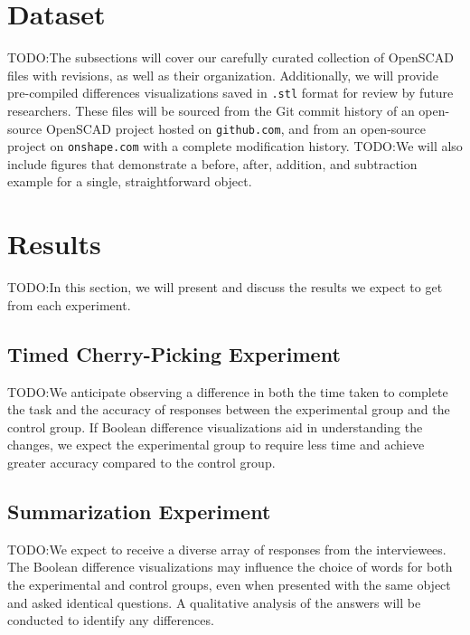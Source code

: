 \documentclass[sigconf,authorversion,nonacm]{acmart}
\begin{document}

\section{Dataset}

TODO:The subsections will cover our carefully curated collection of OpenSCAD files with revisions, as well as their organization. Additionally, we will provide pre-compiled differences visualizations saved in \texttt{.stl} format for review by future researchers. These files will be sourced from the Git commit history of an open-source OpenSCAD project hosted on \texttt{github.com}, and from an open-source project on \texttt{onshape.com} with a complete modification history.
TODO:We will also include figures that demonstrate a before, after, addition, and subtraction example for a single, straightforward object.

\section{Results}

TODO:In this section, we will present and discuss the results we expect to get from each experiment.

\subsection{Timed Cherry-Picking Experiment}

TODO:We anticipate observing a difference in both the time taken to complete the task and the accuracy of responses between the experimental group and the control group. If Boolean difference visualizations aid in understanding the changes, we expect the experimental group to require less time and achieve greater accuracy compared to the control group.

\subsection{Summarization Experiment}

TODO:We expect to receive a diverse array of responses from the interviewees. The Boolean difference visualizations may influence the choice of words for both the experimental and control groups, even when presented with the same object and asked identical questions. A qualitative analysis of the answers will be conducted to identify any differences.
\end{document}
